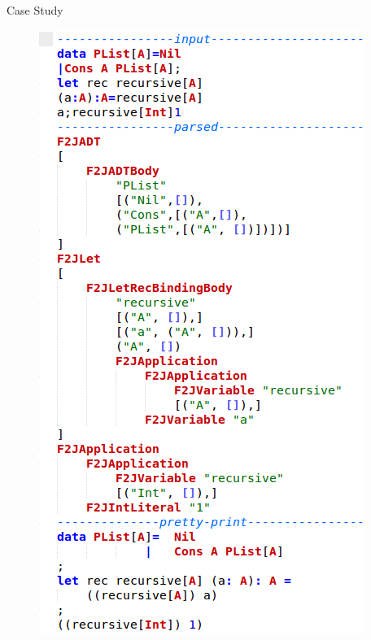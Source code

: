 \documentclass[final]{beamer}
\newlength{\onecolwid}
\begin{document}
\begin{frame}[t]
\begin{columns}[t]
\begin{column}{\onecolwid}
\begin{block}{Case Study}
\begin{figure}
\includegraphics[width=\linewidth]{img/cs.jpg}

\end{figure}



\end{block}




\end{column}
\end{columns}
\end{frame}
\end{document}
